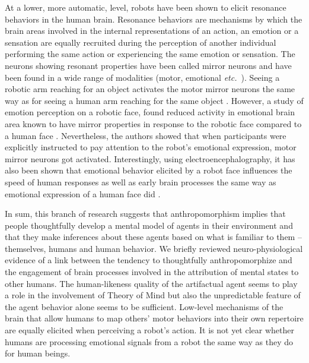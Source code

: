 \documentclass{frontiersSCNS} %
\newcommand{\etc}{{\textit{etc.~}}}
\begin{document}
At a lower, more automatic, level, robots have been shown to elicit resonance
behaviors in the human brain. Resonance behaviors \citep{Rizzolatti1999} are
mechanisms by which the brain areas involved in the internal representations of
an action, an emotion or a sensation are equally recruited during the perception
of another individual performing the same action or experiencing the same
emotion or sensation. The neurons showing resonant properties have been called
mirror neurons and have been found in a wide range of modalities (motor,
emotional \etc). Seeing a robotic arm reaching for an object
activates the motor mirror neurons the same way as for seeing a human arm
reaching for the same object \citep{Gazzola2007,oberman_eeg_2007}. However, a
study of emotion perception on a robotic face, found reduced activity in
emotional brain area known to have mirror properties in response to the robotic
face compared to a human face \citep{Chaminade2010}. Nevertheless, the authors
showed that when participants were explicitly instructed to pay attention to
the robot's emotional expression, motor mirror neurons got activated.
Interestingly, using electroencephalography, it has also been shown that
emotional behavior elicited by a robot face influences the speed of human
responses as well as early brain processes the same way as emotional expression
of a human face did \citep{Dubal2010}.


%


In sum, this branch of research suggests that anthropomorphism implies that
people thoughtfully develop a mental model of agents in their environment and
that they make inferences about these agents based on what is familiar to them
-- themselves, humans and human behavior.
We briefly reviewed neuro-physiological evidence of a link between the tendency
to thoughtfully anthropomorphize and the engagement of brain processes involved
in the attribution of mental states to other humans. The human-likeness quality
of the artifactual agent seems to play a role in the involvement of Theory of
Mind but also the unpredictable feature of the agent behavior alone seems to be
sufficient. Low-level mechanisms of the brain that allow humans to map others'
motor behaviors into their own repertoire are equally elicited when perceiving a
robot's action. It is not yet clear whether humans are processing emotional
signals from a robot the same way as they do for human beings. 
\end{document}
